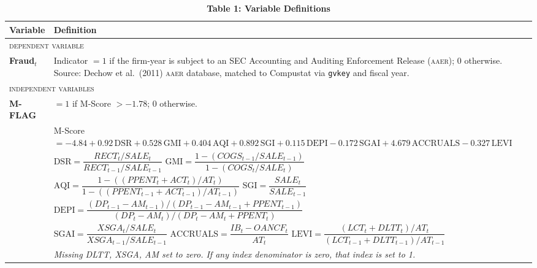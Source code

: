 \documentclass[12pt]{article}
\begin{document}
\begin{table}[h!]
\centering
\caption*{\textbf{Table 1: Variable Definitions}}
\begin{tabular}{p{2.2cm} p{12.5cm}}
\toprule
\textbf{Variable} & \textbf{Definition} \\
\midrule
\multicolumn{2}{l}{\textsc{dependent variable}} \\[3pt]
\textbf{Fraud$_t$} &
  Indicator $= 1$ if the firm-year is subject to an SEC Accounting and Auditing
  Enforcement Release (\textsc{aaer}); 0 otherwise. Source: Dechow et al.\ (2011)
  \textsc{aaer} database, matched to Compustat via \texttt{gvkey} and fiscal year.\\[8pt]

\multicolumn{2}{l}{\textsc{independent variables}} \\[3pt]
\textbf{M-FLAG} &
  $= 1$ if M-Score $> -1.78$; 0 otherwise.\\
  & M-Score $= -4.84 + 0.92\,\text{DSR} + 0.528\,\text{GMI} + 0.404\,\text{AQI}
    + 0.892\,\text{SGI} + 0.115\,\text{DEPI} - 0.172\,\text{SGAI}
    + 4.679\,\text{ACCRUALS} - 0.327\,\text{LEVI}$ \\[2pt]
  & $\text{DSR} = \dfrac{RECT_t/SALE_t}{RECT_{t-1}/SALE_{t-1}}$\quad
    $\text{GMI} = \dfrac{1-(COGS_{t-1}/SALE_{t-1})}{1-(COGS_t/SALE_t)}$\\[6pt]
  & $\text{AQI} = \dfrac{1-((PPENT_t+ACT_t)/AT_t)}{1-((PPENT_{t-1}+ACT_{t-1})/AT_{t-1})}$\quad
    $\text{SGI} = \dfrac{SALE_t}{SALE_{t-1}}$\\[6pt]
  & $\text{DEPI} = \dfrac{(DP_{t-1}-AM_{t-1})/(DP_{t-1}-AM_{t-1}+PPENT_{t-1})}{(DP_t-AM_t)/(DP_t-AM_t+PPENT_t)}$\\[6pt]
  & $\text{SGAI} = \dfrac{XSGA_t/SALE_t}{XSGA_{t-1}/SALE_{t-1}}$\quad
    $\text{ACCRUALS} = \dfrac{IB_t - OANCF_t}{AT_t}$\quad
    $\text{LEVI} = \dfrac{(LCT_t+DLTT_t)/AT_t}{(LCT_{t-1}+DLTT_{t-1})/AT_{t-1}}$\\[4pt]
  & \textit{Missing DLTT, XSGA, AM set to zero. If any index denominator is zero,
    that index is set to 1.}\\[8pt]


\end{tabular}
\end{table}
\end{document}
